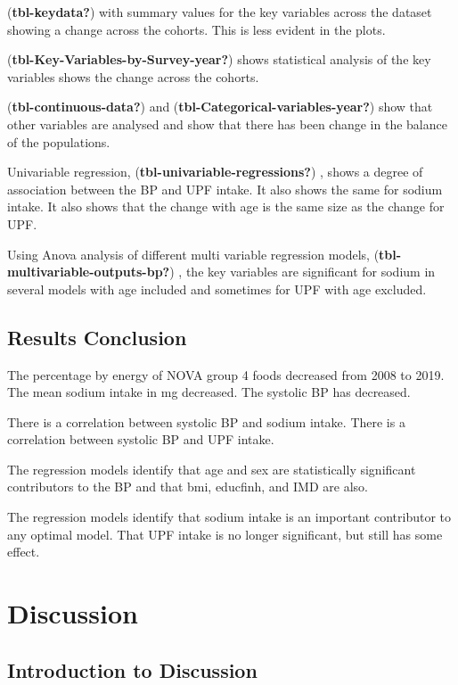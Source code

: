 \documentclass[
]{article}
\begin{document}
(\textbf{tbl-keydata?}) with summary values for the key variables across
the dataset showing a change across the cohorts. This is less evident in
the plots.

(\textbf{tbl-Key-Variables-by-Survey-year?}) shows statistical analysis
of the key variables shows the change across the cohorts.

(\textbf{tbl-continuous-data?}) and
(\textbf{tbl-Categorical-variables-year?}) show that other variables are
analysed and show that there has been change in the balance of the
populations.

Univariable regression, (\textbf{tbl-univariable-regressions?}) , shows
a degree of association between the BP and UPF intake. It also shows the
same for sodium intake. It also shows that the change with age is the
same size as the change for UPF.

Using Anova analysis of different multi variable regression models,
(\textbf{tbl-multivariable-outputs-bp?}) , the key variables are
significant for sodium in several models with age included and sometimes
for UPF with age excluded.

\hypertarget{results-conclusion}{%
\subsection{Results Conclusion}\label{results-conclusion}}

The percentage by energy of NOVA group 4 foods decreased from 2008 to
2019. The mean sodium intake in mg decreased. The systolic BP has
decreased.

There is a correlation between systolic BP and sodium intake. There is a
correlation between systolic BP and UPF intake.

The regression models identify that age and sex are statistically
significant contributors to the BP and that bmi, educfinh, and IMD are
also.

The regression models identify that sodium intake is an important
contributor to any optimal model. That UPF intake is no longer
significant, but still has some effect.

\newpage

\hypertarget{discussion}{%
\section{Discussion}\label{discussion}}

\hypertarget{introduction-to-discussion}{%
\subsection{Introduction to
Discussion}\label{introduction-to-discussion}}
\end{document}
